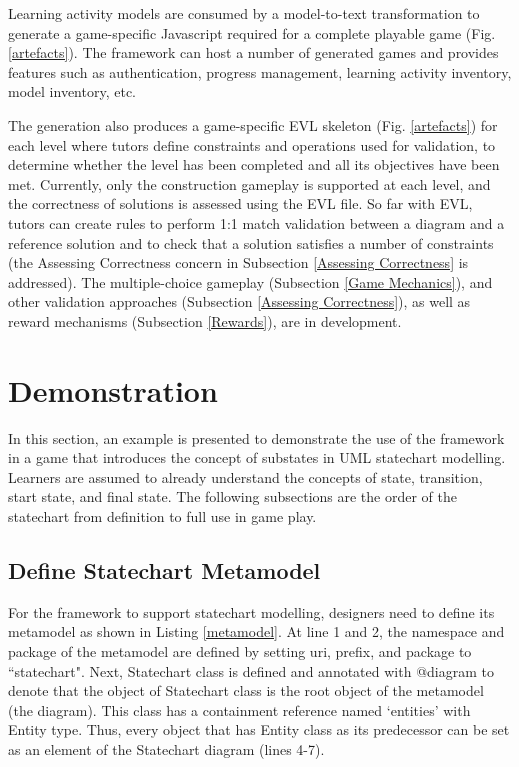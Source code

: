 \documentclass[conference]{IEEEtran}
\begin{document}
Learning activity models are consumed by a model-to-text transformation to generate a game-specific Javascript required for a complete playable game (Fig. \ref{artefacts}). The framework can host a number of generated games and provides features such as authentication, progress management, learning activity inventory, model inventory, etc.  

The generation also produces a game-specific EVL skeleton (Fig. \ref{artefacts}) for each level where tutors define constraints and operations used for validation, to determine whether the level has been completed and all its objectives have been met. Currently, only the construction gameplay is supported at each level, and the correctness of solutions is assessed using the EVL file. So far with EVL, tutors can create rules to perform 1:1 match validation between a diagram and a reference solution and to check that a solution satisfies a number of constraints (the Assessing Correctness concern in Subsection \ref{Assessing Correctness} is addressed). The multiple-choice gameplay (Subsection \ref{Game Mechanics}), and other validation approaches (Subsection \ref{Assessing Correctness}), as well as reward mechanisms (Subsection \ref{Rewards}), are in development. 


\section{Demonstration}
\label{Demonstration}
In this section, an example is presented to demonstrate the use of the framework in a game that introduces the concept of substates in UML statechart modelling. Learners are assumed to already understand the concepts of state, transition, start state, and final state. The following subsections are the order of the statechart from definition to full use in game play.
 
\subsection{Define Statechart Metamodel}
For the framework to support statechart modelling, designers need to define its metamodel as shown in Listing \ref{metamodel}. At line 1 and 2, the namespace and package of the metamodel are defined by setting uri, prefix, and package to ``statechart". Next, Statechart class is defined and annotated with {\selectfont @diagram} to denote that the object of Statechart class is the root object of the metamodel (the diagram). This class has a containment reference named `entities' with Entity type. Thus, every object that has Entity class as its predecessor can be set as an element of the Statechart diagram (lines 4-7).  
\end{document}
